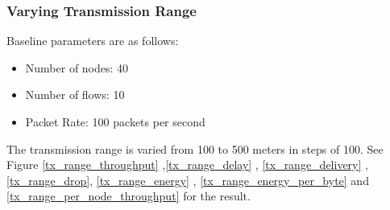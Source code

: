 \subsubsection{Varying Transmission Range}
Baseline parameters are as follows:
\begin{itemize}
    \item Number of nodes: 40
    \item Number of flows: 10
    \item Packet Rate: 100 packets per second
\end{itemize}
The transmission range is varied from 100 to 500 meters in steps of 100.
See Figure \ref{tx_range_throughput} ,\ref{tx_range_delay} , \ref{tx_range_delivery} , \ref{tx_range_drop}, \ref{tx_range_energy} , \ref{tx_range_energy_per_byte} and \ref{tx_range_per_node_throughput} for the result.
